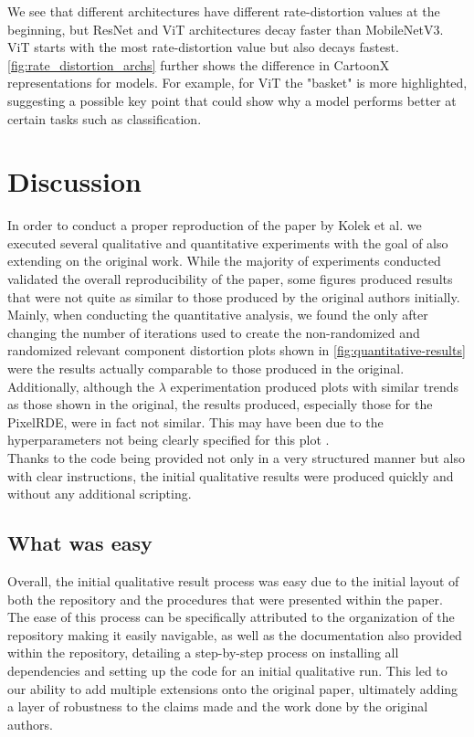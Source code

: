 We see that different architectures have different rate-distortion values at the beginning, but ResNet and ViT architectures decay faster than MobileNetV3. ViT starts with the most rate-distortion value but also decays fastest. \autoref{fig:rate_distortion_archs} further shows the difference in CartoonX representations for models. For example, for ViT the "basket" is more highlighted, suggesting a possible key point that could show why a model performs better at certain tasks such as classification.



\section{Discussion}\label{sec:discussion}
In order to conduct a proper reproduction of the paper by Kolek et al. we executed several qualitative and quantitative experiments with the goal of also extending on the original work. While the majority of experiments conducted validated the overall reproducibility of the paper, some figures produced results that were not quite as similar to those produced by the original authors initially. Mainly, when conducting the quantitative analysis, we found the only after changing the number of iterations used to create the non-randomized and randomized relevant component distortion plots shown in \autoref{fig:quantitative-results} were the results actually comparable to those produced in the original. Additionally, although the $\lambda$ experimentation produced plots with similar trends as those shown in the original, the results produced, especially those for the PixelRDE, were in fact not similar. This may have been due to the hyperparameters not being clearly specified for this plot . \\

Thanks to the code being provided not only in a very structured manner but also with clear instructions, the initial qualitative results were produced quickly and without any additional scripting.

\subsection{What was easy}
Overall, the initial qualitative result process was easy due to the initial layout of both the repository and the procedures that were presented within the paper. The ease of this process can be specifically attributed to the organization of the repository making it easily navigable, as well as the documentation also provided within the repository, detailing a step-by-step process on installing all dependencies and setting up the code for an initial qualitative run. This led to our ability to add multiple extensions onto the original paper, ultimately adding a layer of robustness to the claims made and the work done by the original authors. 
